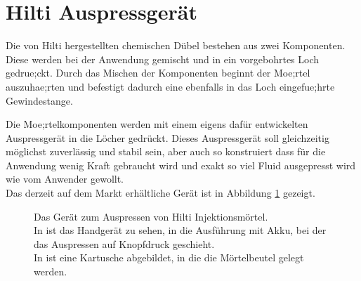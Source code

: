 \section{Hilti Auspressgerät}
\label{Kapitel:Auspressgeraet}
Die von Hilti hergestellten chemischen Dübel bestehen aus zwei Komponenten. Diese werden bei der Anwendung gemischt und in ein vorgebohrtes Loch gedrue;ckt. Durch das Mischen der Komponenten beginnt der Moe;rtel auszuhae;rten und befestigt dadurch eine ebenfalls in das Loch eingefue;hrte Gewindestange.

Die Moe;rtelkomponenten werden mit einem eigens dafür entwickelten Auspressgerät in die Löcher gedrückt. Dieses Auspressgerät soll gleichzeitig möglichst zuverlässig und stabil sein, aber auch so konstruiert dass für die Anwendung wenig Kraft gebraucht wird und exakt so viel Fluid ausgepresst wird wie vom Anwender gewollt.\\
Das derzeit auf dem Markt erhältliche Gerät ist in Abbildung \ref{fig:Auspressgeraet} gezeigt.
%
\begin{figure}
    \centering
    \caption{Das Gerät zum Auspressen von Hilti Injektionsmörtel.\\In {} ist das Handgerät zu sehen, in  die Ausführung mit Akku, bei der das Auspressen auf Knopfdruck geschieht.\\
    In  ist eine Kartusche abgebildet, in die die Mörtelbeutel gelegt werden.}
    \label{fig:Auspressgeraet}
\end{figure}
%

